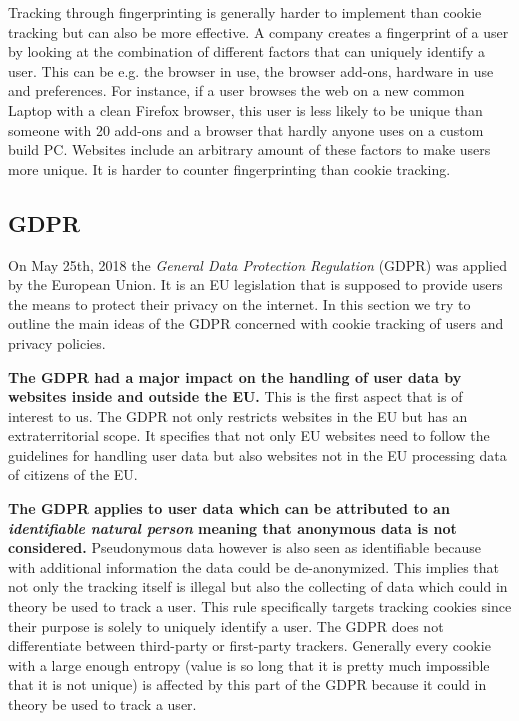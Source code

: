Tracking through fingerprinting is generally harder to implement than cookie tracking but can also be more effective. A company
creates a fingerprint of a user by looking at the combination of different factors that can uniquely identify a user. This can
be e.g. the browser in use, the browser add-ons, hardware in use and preferences. For instance, if a user browses the
web on a new common Laptop with a clean Firefox browser, this user is less
likely to be unique than someone with 20 add-ons and a browser that hardly anyone uses on a custom build PC.
Websites include an arbitrary amount of these factors to make users more unique. It is harder to counter fingerprinting
than cookie tracking.

\subsection{GDPR}

On May 25th, 2018 the \emph{General Data Protection Regulation} (GDPR) was applied by the European Union. It is an EU
legislation that is supposed to provide users the means to protect their privacy on the internet. In this section we try
to outline the main ideas of the GDPR concerned with cookie tracking of users and privacy policies.

\textbf{The GDPR had a major impact on the handling of user data by websites inside and outside the EU.} This is the first
aspect that is of interest to us. The GDPR not only restricts websites in the EU but has an extraterritorial scope.
It specifies that not only EU websites need to follow the guidelines for handling user data but also websites not in the
EU processing data of citizens of the EU.

\textbf{The GDPR applies to user data which can be attributed to an \emph{identifiable natural person} meaning that anonymous
data is not considered.} Pseudonymous data however is also seen as identifiable because with additional information
the data could be de-anonymized. This implies that not only the tracking itself is illegal but also the collecting of data
which could in theory be used to track a user. This rule specifically targets tracking cookies since their purpose is
solely to uniquely identify a user. The GDPR does not differentiate between third-party or first-party trackers.
Generally every cookie with a large enough entropy (value is so long that it is pretty much impossible that it is not
unique) is affected by this part of the GDPR because it could in theory be used to track a user.

